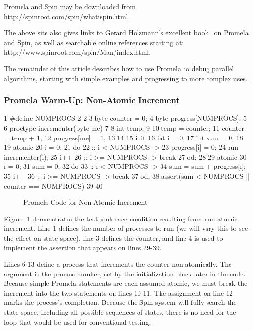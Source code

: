 Promela and Spin may be downloaded from
\url{http://spinroot.com/spin/whatispin.html}.

The above site also gives links to Gerard Holzmann's excellent
book~\cite{Holzmann03a} on Promela and Spin,
as well as searchable online references starting at:
\url{http://www.spinroot.com/spin/Man/index.html}.

The remainder of this article describes how to use Promela to debug
parallel algorithms, starting with simple examples and progressing to
more complex uses.

\subsubsection{Promela Warm-Up: Non-Atomic Increment}
\label{sec:formal:Promela Warm-Up: Non-Atomic Increment}

{ \scriptsize
\begin{verbbox}
  1 #define NUMPROCS 2
  2
  3 byte counter = 0;
  4 byte progress[NUMPROCS];
  5
  6 proctype incrementer(byte me)
  7 {
  8   int temp;
  9
 10   temp = counter;
 11   counter = temp + 1;
 12   progress[me] = 1;
 13 }
 14
 15 init {
 16   int i = 0;
 17   int sum = 0;
 18
 19   atomic {
 20     i = 0;
 21     do
 22     :: i < NUMPROCS ->
 23       progress[i] = 0;
 24       run incrementer(i);
 25       i++
 26     :: i >= NUMPROCS -> break
 27     od;
 28   }
 29   atomic {
 30     i = 0;
 31     sum = 0;
 32     do
 33     :: i < NUMPROCS ->
 34       sum = sum + progress[i];
 35       i++
 36     :: i >= NUMPROCS -> break
 37     od;
 38     assert(sum < NUMPROCS || counter == NUMPROCS)
 39   }
 40 }
\end{verbbox}
}
\begin{figure}[tbp]
\centering
\theverbbox
\caption{Promela Code for Non-Atomic Increment}
\label{fig:analysis:Promela Code for Non-Atomic Increment}
\end{figure}

Figure~\ref{fig:analysis:Promela Code for Non-Atomic Increment}
demonstrates the textbook race condition
resulting from non-atomic increment.
Line 1 defines the number of processes to run (we will vary this
to see the effect on state space), line 3 defines the counter,
and line 4 is used to implement the assertion that appears on
lines 29-39.

Lines 6-13 define a process that increments the counter non-atomically.
The argument  is the process number, set by the initialization
block later in the code.
Because simple Promela statements are each assumed atomic, we must
break the increment into the two statements on lines 10-11.
The assignment on line 12 marks the process's completion.
Because the Spin system will fully search the state space, including
all possible sequences of states, there is no need for the loop
that would be used for conventional testing.


